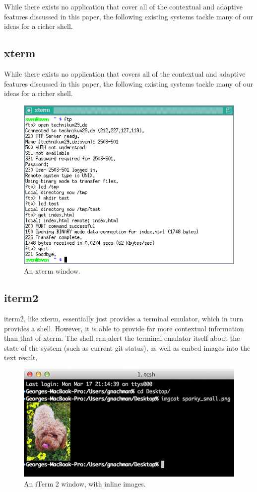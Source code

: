 While there exists no application that cover all of the contextual and adaptive
features discussed in this paper, the following existing systems tackle many of
our ideas for a richer shell.

\subsection{xterm}
While there exists no application that covers all of the contextual and adaptive
features discussed in this paper, the following existing systems tackle many of
our ideas for a richer shell.
\begin{figure}[H]
  \centering
  \includegraphics[width=0.8\linewidth]{figures/existing/xterm.png}
  \caption{An xterm window.}
  \label{fig:xterm}
\end{figure}

\subsection{iterm2}
iterm2, like xterm, essentially just provides a terminal emulator, which in turn
provides a shell. However, it is able to provide far more contextual information
than that of xterm. The shell can alert the terminal emulator itself about the
state of the system (such as current git status), as well as embed images into
the text result.
\begin{figure}[H]
  \centering
  \includegraphics[width=0.8\linewidth]{figures/existing/iterm2.png}
  \caption{An iTerm 2 window, with inline images.}
  \label{fig:iterm}
\end{figure}

